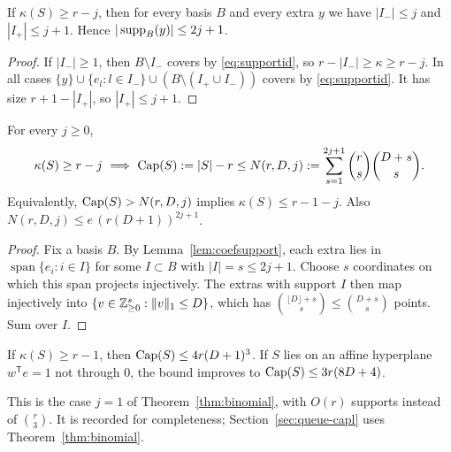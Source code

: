 \begin{lemma}\label{lem:coefsupport}
If $\kappa(S)\ge r-j$, then for every basis $B$ and every extra $y$ we have $|I_-|\le j$ and $|I_+|\le j+1$. Hence
$|\operatorname{supp}_B(y)|\le2j+1$.
\end{lemma}

\begin{proof}
If $|I_-|\ge1$, then $B\setminus I_-$ covers by \eqref{eq:supportid}, so $r-|I_-|\ge\kappa\ge r-j$. In all cases
$\{y\}\cup\{e_l:l\in I_-\}\cup(B\setminus(I_+\cup I_-))$ covers by \eqref{eq:supportid}. It has size $r+1-|I_+|$, so
$|I_+|\le j+1$.
\end{proof}

\begin{theorem}\label{thm:binomial}
For every $j\ge0$,
\[
\kappa(S)\ge r-j\ \Longrightarrow\ \qCap(S):=|S|-r\le N(r,D,j):=\sum_{s=1}^{2j+1}\binom rs\binom{D+s}s.
\]
Equivalently, $\operatorname{Cap}(S)>N(r,D,j)$ implies $\kappa(S)\le r-1-j$. Also $N(r,D,j)\le e\,(r(D+1))^{2j+1}$.
\end{theorem}

\begin{proof}
Fix a basis $B$. By Lemma~\ref{lem:coefsupport}, each extra lies in $\operatorname{span}\{e_i:i\in I\}$ for some $I\subset B$ with
$|I|=s\le2j+1$. Choose $s$ coordinates on which this span projects injectively. The extras with support $I$ then map
injectively into $\{v\in\mathbb{Z}^s_{\ge0}:\|v\|_1\le D\}$, which has $\binom{\lfloor D\rfloor+s}s\le\binom{D+s}s$ points. Sum over $I$.
\end{proof}

\begin{theorem}\label{thm:tcl}
If $\kappa(S)\ge r-1$, then $\operatorname{Cap}(S)\le4r(D+1)^3$. If $S$ lies on an affine hyperplane $w^{\mathsf T}e=1$ not through $0$,
the bound improves to $\operatorname{Cap}(S)\le3r(8D+4)$.
\end{theorem}

This is the case $j=1$ of Theorem~\ref{thm:binomial}, with $O(r)$ supports instead of $\binom r3$. It is recorded for
completeness; Section~\ref{sec:queue-capl} uses Theorem~\ref{thm:binomial}.

